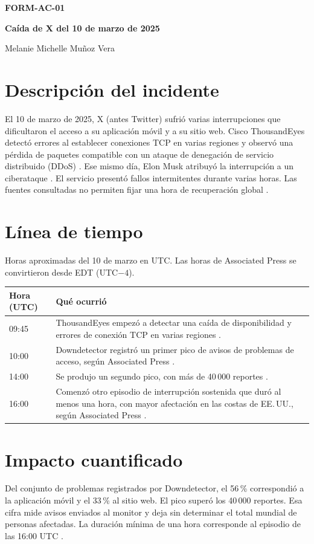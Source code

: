 \documentclass[11pt,a4paper]{article}
\begin{document}
{\large\bfseries FORM-AC-01\par}
{\LARGE\bfseries Caída de X del 10 de marzo de 2025\par}
{Melanie Michelle Muñoz Vera\par}

\section*{Descripción del incidente}
El 10 de marzo de 2025, X (antes Twitter) sufrió varias interrupciones que dificultaron el acceso a su aplicación móvil y a su sitio web. Cisco ThousandEyes detectó errores al establecer conexiones TCP en varias regiones y observó una pérdida de paquetes compatible con un ataque de denegación de servicio distribuido (DDoS) \cite{hicks-x-2025}. Ese mismo día, Elon Musk atribuyó la interrupción a un ciberataque \cite{chapman-ortutay-x-2025}. El servicio presentó fallos intermitentes durante varias horas. Las fuentes consultadas no permiten fijar una hora de recuperación global \cite[p.~15]{csc-threat-update-2025}.

\section*{Línea de tiempo}
Horas aproximadas del 10 de marzo en UTC. Las horas de Associated Press se convirtieron desde EDT (UTC$-4$).

\begin{tabularx}{\linewidth}{@{}l>{\raggedright\arraybackslash}X@{}}
\toprule
\textbf{Hora (UTC)} & \textbf{Qué ocurrió} \\
\midrule
09:45 & ThousandEyes empezó a detectar una caída de disponibilidad y errores de conexión TCP en varias regiones \cite{hicks-x-2025}. \\
10:00 & Downdetector registró un primer pico de avisos de problemas de acceso, según Associated Press \cite{chapman-ortutay-x-2025}. \\
14:00 & Se produjo un segundo pico, con más de 40\,000 reportes \cite{chapman-ortutay-x-2025}. \\
16:00 & Comenzó otro episodio de interrupción sostenida que duró al menos una hora, con mayor afectación en las costas de EE.\,UU., según Associated Press \cite{chapman-ortutay-x-2025}. \\
\bottomrule
\end{tabularx}

\section*{Impacto cuantificado}
Del conjunto de problemas registrados por Downdetector, el 56\,\% correspondió a la aplicación móvil y el 33\,\% al sitio web. El pico superó los 40\,000 reportes. Esa cifra mide avisos enviados al monitor y deja sin determinar el total mundial de personas afectadas. La duración mínima de una hora corresponde al episodio de las 16:00 UTC \cite{chapman-ortutay-x-2025}.

\printbibliography[title={Referencias}]
\end{document}

